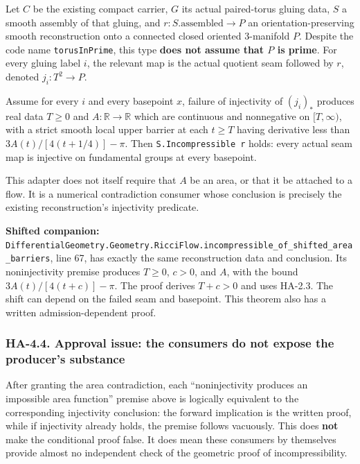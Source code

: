 \documentclass[
  letterpaper,
  11pt]{article}
\begin{document}
Let \(C\) be the existing compact carrier, \(G\) its actual paired-torus
gluing data, \(S\) a smooth assembly of that gluing, and
\(r:S.\mathrm{assembled}\to P\) an orientation-preserving smooth
reconstruction onto a connected closed oriented 3-manifold \(P\).
Despite the code name
{\small\texttt{torus\allowbreak{}In\allowbreak{}Prime}}, this type
\textbf{does not assume that \(P\) is prime}. For every gluing label
\(i\), the relevant map is the actual quotient seam followed by \(r\),
denoted \(j_i:T^2\to P\).

Assume for every \(i\) and every basepoint \(x\), failure of injectivity
of \((j_i)_*\) produces real data \(T\ge0\) and
\(A:\mathbb R\to\mathbb R\) which are continuous and nonnegative on
\([T,\infty)\), with a strict smooth local upper barrier at each
\(t\ge T\) having derivative less than \(3A(t)/[4(t+1/4)]-\pi\). Then
{\small\texttt{S.\allowbreak{}Incompressible r}} holds: every actual
seam map is injective on fundamental groups at every basepoint.

This adapter does not itself require that \(A\) be an area, or that it
be attached to a flow. It is a numerical contradiction consumer whose
conclusion is precisely the existing reconstruction's injectivity
predicate.

\textbf{Shifted companion:}
{\small\texttt{Differential\allowbreak{}Geometry.\allowbreak{}Geometry.\allowbreak{}Ricci\allowbreak{}Flow.\allowbreak{}incompressible\_\allowbreak{}of\_\allowbreak{}shifted\_\allowbreak{}area\_\allowbreak{}barriers}},
line 67, has exactly the same reconstruction data and conclusion. Its
noninjectivity premise produces \(T\ge0\), \(c>0\), and \(A\), with the
bound \(3A(t)/[4(t+c)]-\pi\). The proof derives \(T+c>0\) and uses
HA-2.3. The shift can depend on the failed seam and basepoint. This
theorem also has a written admission-dependent proof.

\subsubsection{HA-4.4. Approval issue: the consumers do not expose the
producer's substance}\label{ha-4-4}

After granting the area contradiction, each ``noninjectivity produces an
impossible area function'' premise above is logically equivalent to the
corresponding injectivity conclusion: the forward implication is the
written proof, while if injectivity already holds, the premise follows
vacuously. This does \textbf{not} make the conditional proof false. It
does mean these consumers by themselves provide almost no independent
check of the geometric proof of incompressibility.
\end{document}
